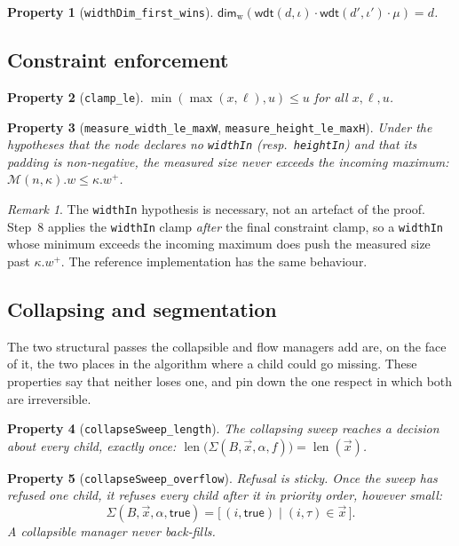 \documentclass[11pt,a4paper]{article}
\newcommand{\wdt}{\mathsf{wdt}}
\newcommand{\Mm}{\mathcal{M}}          %
\newcommand{\Dimw}{\mathsf{dim}_{\mathrm{w}}}
\newcommand{\jv}[1]{\texttt{#1}}       %
\DeclareMathOperator{\len}{len}
\theoremstyle{definition}
\theoremstyle{plain}
\newtheorem{property}{Property}[section]
\theoremstyle{remark}
\newtheorem*{remark}{Remark}
\begin{document}
\begin{property}[\texttt{widthDim\_first\_wins}]
$\Dimw(\wdt(d,\iota)\cdot\wdt(d',\iota')\cdot\mu) = d$.
\end{property}

\subsection{Constraint enforcement}

\begin{property}[\texttt{clamp\_le}]
$\min(\max(x, \ell), u) \leq u$ for all $x, \ell, u$.
\end{property}

\begin{property}[\texttt{measure\_width\_le\_maxW}, \texttt{measure\_height\_le\_maxH}]
Under the hypotheses that the node declares no \jv{widthIn} (resp.\
\jv{heightIn}) and that its padding is non-negative, the measured size never
exceeds the incoming maximum:
$\Mm(n,\kappa).w \leq \kappa.w^+$.
\end{property}

\begin{remark}
The \jv{widthIn} hypothesis is necessary, not an artefact of the proof. Step~8
applies the \jv{widthIn} clamp \emph{after} the final constraint clamp, so a
\jv{widthIn} whose minimum exceeds the incoming maximum does push the measured
size past $\kappa.w^+$. The reference implementation has the same behaviour.
\end{remark}

\subsection{Collapsing and segmentation}

The two structural passes the collapsible and flow managers add are, on the face
of it, the two places in the algorithm where a child could go missing. These
properties say that neither loses one, and pin down the one respect in which
both are irreversible.

\begin{property}[\texttt{collapseSweep\_length}]
The collapsing sweep reaches a decision about every child, exactly once:
$\len\bigl(\Sigma(B, \vec{x}, \alpha, f)\bigr) = \len(\vec{x})$.
\end{property}

\begin{property}[\texttt{collapseSweep\_overflow}]
\emph{Refusal is sticky.} Once the sweep has refused one child, it refuses every
child after it in priority order, however small:
\[
  \Sigma(B, \vec{x}, \alpha, \textsf{true})
    = \bigl[\,(i, \textsf{true}) \;\big|\; (i, \tau) \in \vec{x}\,\bigr].
\]
A collapsible manager never back-fills.
\end{property}
\end{document}
